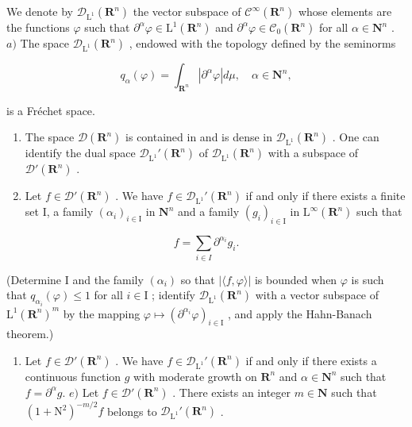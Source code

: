 We denote by \(\mathcal{D}_{\mathrm{L}^{1}}(\mathbf{R}^{n})\) the vector subspace of \(\mathcal{C}^{\infty}(\mathbf{R}^{n})\) whose elements are the functions \(\varphi\) such that \(\partial^{\alpha}\varphi\in\mathrm{L}^{1}(\mathbf{R}^{n})\) and \(\partial^{\alpha}\varphi\in\mathcal{C}_{0}(\mathbf{R}^{n})\) for all \(\alpha\in\mathbf{N}^{n}\) . \(a)\) The space \(\mathcal{D}_{\mathrm{L}^{1}}(\mathbf{R}^{n})\) , endowed with the topology defined by the seminorms

\[
q _ {\alpha} (\varphi) = \int_ {\mathbf {R} ^ {n}} | \partial^ {\alpha} \varphi | d \mu , \quad \alpha \in \mathbf {N} ^ {n},
\]

is a Fréchet space.

\begin{enumerate}
\def\labelenumi{\alph{enumi})}
\setcounter{enumi}{1}
\item
  The space \(\mathcal{D}(\mathbf{R}^n)\) is contained in and is dense in \(\mathcal{D}_{\mathrm{L}^1}(\mathbf{R}^n)\) . One can identify the dual space \(\mathcal{D}_{\mathrm{L}^1}'(\mathbf{R}^n)\) of \(\mathcal{D}_{\mathrm{L}^1}(\mathbf{R}^n)\) with a subspace of \(\mathcal{D}'(\mathbf{R}^n)\) .
\item
  Let \(f \in \mathcal{D}'(\mathbf{R}^n)\) . We have \(f \in \mathcal{D}_{\mathrm{L}^1}'(\mathbf{R}^n)\) if and only if there exists a finite set I, a family \((\alpha_i)_{i \in \mathrm{I}}\) in \(\mathbf{N}^n\) and a family \((g_i)_{i \in \mathrm{I}}\) in \(\mathrm{L}^\infty(\mathbf{R}^n)\) such that
\end{enumerate}

\[
f = \sum_ {i \in I} \partial^ {\alpha_ {i}} g _ {i}.
\]

(Determine I and the family \((\alpha_{i})\) so that \(|\langle f,\varphi\rangle |\) is bounded when \(\varphi\) is such that \(q_{\alpha_i}(\varphi)\leqslant 1\) for all \(i\in \mathrm{I}\) ; identify \(\mathcal{D}_{\mathrm{L}^1}(\mathbf{R}^n)\) with a vector subspace of \(\mathrm{L}^1 (\mathbf{R}^n)^m\) by the mapping \(\varphi \mapsto (\partial^{\alpha_i}\varphi)_{i\in \mathrm{I}}\) , and apply the Hahn-Banach theorem.)

\begin{enumerate}
\def\labelenumi{\alph{enumi})}
\setcounter{enumi}{3}
\tightlist
\item
  Let \(f \in \mathcal{D}'(\mathbf{R}^n)\) . We have \(f \in \mathcal{D}_{\mathrm{L}^1}'(\mathbf{R}^n)\) if and only if there exists a continuous function \(g\) with moderate growth on \(\mathbf{R}^n\) and \(\alpha \in \mathbf{N}^n\) such that \(f = \partial^\alpha g\). \(e)\) Let \(f \in \mathcal{D}'(\mathbf{R}^n)\) . There exists an integer \(m \in \mathbf{N}\) such that \((1 + \mathrm{N}^2)^{-m/2}f\) belongs to \(\mathcal{D}_{\mathrm{L}^1}'(\mathbf{R}^n)\) .
\end{enumerate}

